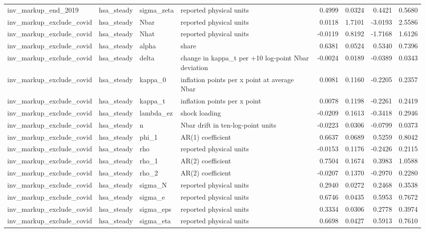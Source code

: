 \begin{tabular}{llllrrrr}
inv\_markup\_end\_2019 & hsa\_steady & sigma\_zeta & reported physical units & 0.4999 & 0.0324 & 0.4421 & 0.5680 \\
inv\_markup\_exclude\_covid & hsa\_steady & Nbar & reported physical units & 0.0118 & 1.7101 & -3.0193 & 2.5586 \\
inv\_markup\_exclude\_covid & hsa\_steady & Nhat & reported physical units & -0.0119 & 0.8192 & -1.7168 & 1.6126 \\
inv\_markup\_exclude\_covid & hsa\_steady & alpha & share & 0.6381 & 0.0524 & 0.5340 & 0.7396 \\
inv\_markup\_exclude\_covid & hsa\_steady & delta & change in kappa\_t per +10 log-point Nbar deviation & -0.0024 & 0.0189 & -0.0389 & 0.0343 \\
inv\_markup\_exclude\_covid & hsa\_steady & kappa\_0 & inflation points per x point at average Nbar & 0.0081 & 0.1160 & -0.2205 & 0.2357 \\
inv\_markup\_exclude\_covid & hsa\_steady & kappa\_t & inflation points per x point & 0.0078 & 0.1198 & -0.2261 & 0.2419 \\
inv\_markup\_exclude\_covid & hsa\_steady & lambda\_ez & shock loading & -0.0209 & 0.1613 & -0.3418 & 0.2946 \\
inv\_markup\_exclude\_covid & hsa\_steady & n & Nbar drift in ten-log-point units & -0.0223 & 0.0306 & -0.0799 & 0.0373 \\
inv\_markup\_exclude\_covid & hsa\_steady & phi\_1 & AR(1) coefficient & 0.6637 & 0.0689 & 0.5259 & 0.8042 \\
inv\_markup\_exclude\_covid & hsa\_steady & rho & reported physical units & -0.0153 & 0.1176 & -0.2426 & 0.2115 \\
inv\_markup\_exclude\_covid & hsa\_steady & rho\_1 & AR(2) coefficient & 0.7504 & 0.1674 & 0.3983 & 1.0588 \\
inv\_markup\_exclude\_covid & hsa\_steady & rho\_2 & AR(2) coefficient & -0.0207 & 0.1370 & -0.2970 & 0.2280 \\
inv\_markup\_exclude\_covid & hsa\_steady & sigma\_N & reported physical units & 0.2940 & 0.0272 & 0.2468 & 0.3538 \\
inv\_markup\_exclude\_covid & hsa\_steady & sigma\_e & reported physical units & 0.6746 & 0.0435 & 0.5953 & 0.7672 \\
inv\_markup\_exclude\_covid & hsa\_steady & sigma\_eps & reported physical units & 0.3334 & 0.0306 & 0.2778 & 0.3974 \\
inv\_markup\_exclude\_covid & hsa\_steady & sigma\_eta & reported physical units & 0.6698 & 0.0427 & 0.5913 & 0.7610 \\

\end{tabular}
